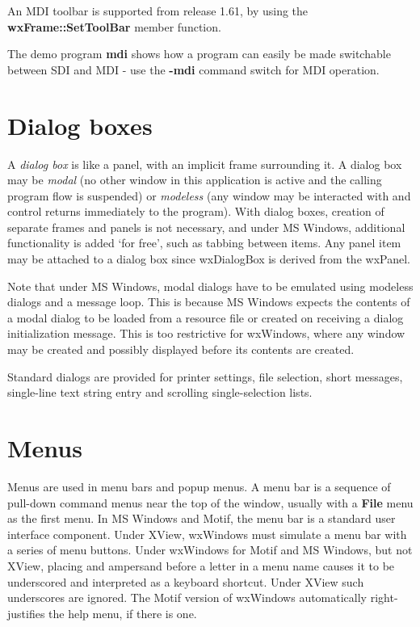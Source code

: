 An MDI toolbar is supported from release 1.61, by using the\rtfsp
{\bf wxFrame::SetToolBar} member function.

The demo program {\bf mdi} shows how a program can easily be made
switchable between SDI and MDI - use the {\bf -mdi} command switch for
MDI operation.

\section{Dialog boxes}\label{dialogs}

A {\it dialog box} is like a panel, with an implicit frame surrounding
it. A dialog box may be {\it modal} (no other window in this application
is active and the calling program flow is suspended) or {\it modeless}
(any window may be interacted with and control returns immediately to
the program). With dialog boxes, creation of separate frames and panels
is not necessary, and under MS Windows, additional functionality is added
`for free', such as tabbing between items. Any panel item may be
attached to a dialog box since wxDialogBox is derived from the wxPanel.

Note that under MS Windows, modal dialogs have to be emulated using
modeless dialogs and a message loop. This is because MS Windows expects
the contents of a modal dialog to be loaded from a resource file or
created on receiving a dialog initialization message. This is too
restrictive for wxWindows, where any window may be created and possibly
displayed before its contents are created.

Standard dialogs are provided for printer settings, file selection,
short messages, single-line text string entry and scrolling
single-selection lists.

\section{Menus}

Menus are used in menu bars and popup menus. A menu bar is a sequence of
pull-down command menus near the top of the window, usually with a {\bf
File} menu as the first menu. In MS Windows and Motif, the menu bar is
a standard user interface component. Under XView, wxWindows must
simulate a menu bar with a series of menu buttons. Under wxWindows for
Motif and MS Windows, but not XView, placing and ampersand before a
letter in a menu name causes it to be underscored and interpreted as a
keyboard shortcut. Under XView such underscores are ignored. The Motif
version of wxWindows automatically right-justifies the help menu, if
there is one.

